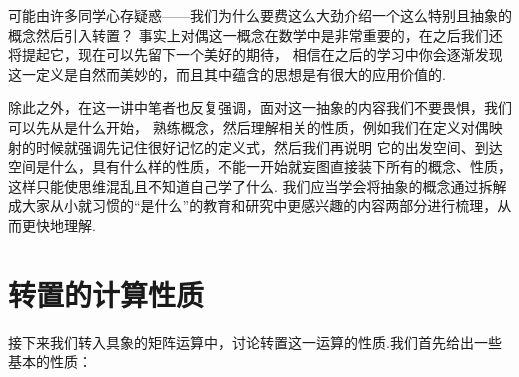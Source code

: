 可能由许多同学心存疑惑——我们为什么要费这么大劲介绍一个这么特别且抽象的概念然后引入转置？
事实上对偶这一概念在数学中是非常重要的，在之后我们还将提起它，现在可以先留下一个美好的期待，
相信在之后的学习中你会逐渐发现这一定义是自然而美妙的，而且其中蕴含的思想是有很大的应用价值的.

除此之外，在这一讲中笔者也反复强调，面对这一抽象的内容我们不要畏惧，我们可以先从是什么开始，
熟练概念，然后理解相关的性质，例如我们在定义对偶映射的时候就强调先记住很好记忆的定义式，然后我们再说明
它的出发空间、到达空间是什么，具有什么样的性质，不能一开始就妄图直接装下所有的概念、性质，这样只能使思维混乱且不知道自己学了什么.
我们应当学会将抽象的概念通过拆解成大家从小就习惯的``是什么''的教育和研究中更感兴趣的内容两部分进行梳理，从而更快地理解.

\section{转置的计算性质}
接下来我们转入具象的矩阵运算中，讨论转置这一运算的性质.我们首先给出一些基本的性质：
